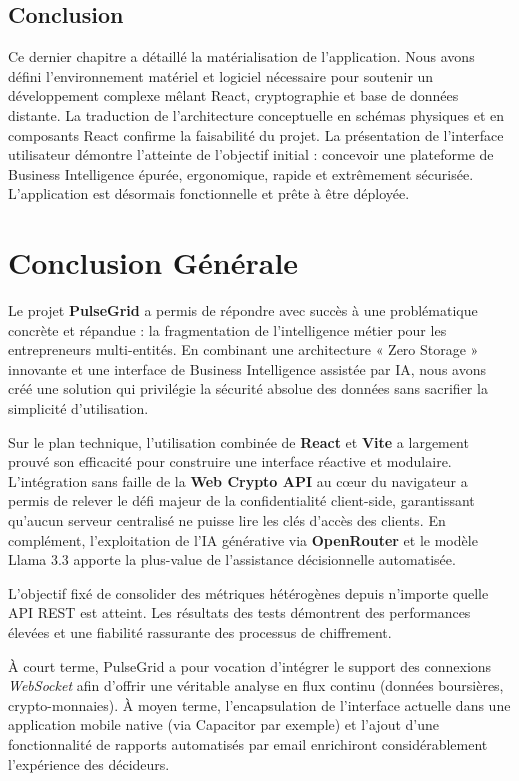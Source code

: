 ﻿\documentclass[12pt,a4paper,oneside]{report} %
\begin{document}
\section{Conclusion}

Ce dernier chapitre a détaillé la matérialisation de l'application. Nous avons défini l'environnement matériel et logiciel nécessaire pour soutenir un développement complexe mêlant React, cryptographie et base de données distante. La traduction de l'architecture conceptuelle en schémas physiques et en composants React confirme la faisabilité du projet. La présentation de l'interface utilisateur démontre l'atteinte de l'objectif initial : concevoir une plateforme de Business Intelligence épurée, ergonomique, rapide et extrêmement sécurisée. L'application est désormais fonctionnelle et prête à être déployée.

\chapter*{Conclusion Générale}

Le projet \textbf{PulseGrid} a permis de répondre avec succès à une problématique concrète et répandue : la fragmentation de l'intelligence métier pour les entrepreneurs multi-entités. En combinant une architecture « Zero Storage » innovante et une interface de Business Intelligence assistée par IA, nous avons créé une solution qui privilégie la sécurité absolue des données sans sacrifier la simplicité d'utilisation.

Sur le plan technique, l'utilisation combinée de \textbf{React} et \textbf{Vite} a largement prouvé son efficacité pour construire une interface réactive et modulaire. L'intégration sans faille de la \textbf{Web Crypto API} au cœur du navigateur a permis de relever le défi majeur de la confidentialité client-side, garantissant qu'aucun serveur centralisé ne puisse lire les clés d'accès des clients. En complément, l'exploitation de l'IA générative via \textbf{OpenRouter} et le modèle Llama 3.3 apporte la plus-value de l'assistance décisionnelle automatisée.

L'objectif fixé de consolider des métriques hétérogènes depuis n'importe quelle API REST est atteint. Les résultats des tests démontrent des performances élevées et une fiabilité rassurante des processus de chiffrement.

À court terme, PulseGrid a pour vocation d'intégrer le support des connexions \textit{WebSocket} afin d'offrir une véritable analyse en flux continu (données boursières, crypto-monnaies). À moyen terme, l'encapsulation de l'interface actuelle dans une application mobile native (via Capacitor par exemple) et l'ajout d'une fonctionnalité de rapports automatisés par email enrichiront considérablement l'expérience des décideurs.
\end{document}
